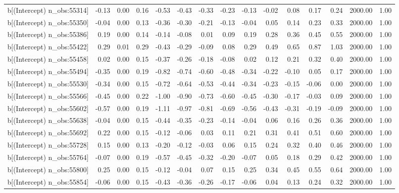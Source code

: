 \begin{table}[ht]
\begin{tabular}{rrrrrrrrrrrrrrr}
  b[(Intercept) n\_obs:55314] & -0.13 & 0.00 & 0.16 & -0.53 & -0.43 & -0.33 & -0.23 & -0.13 & -0.02 & 0.08 & 0.17 & 0.24 & 2000.00 & 1.00 \\ 
  b[(Intercept) n\_obs:55350] & -0.04 & 0.00 & 0.13 & -0.36 & -0.30 & -0.21 & -0.13 & -0.04 & 0.05 & 0.14 & 0.23 & 0.33 & 2000.00 & 1.00 \\ 
  b[(Intercept) n\_obs:55386] & 0.19 & 0.00 & 0.14 & -0.14 & -0.08 & 0.01 & 0.09 & 0.19 & 0.28 & 0.36 & 0.45 & 0.55 & 2000.00 & 1.00 \\ 
  b[(Intercept) n\_obs:55422] & 0.29 & 0.01 & 0.29 & -0.43 & -0.29 & -0.09 & 0.08 & 0.29 & 0.49 & 0.65 & 0.87 & 1.03 & 2000.00 & 1.00 \\ 
  b[(Intercept) n\_obs:55458] & 0.02 & 0.00 & 0.15 & -0.37 & -0.26 & -0.18 & -0.08 & 0.02 & 0.12 & 0.21 & 0.32 & 0.40 & 2000.00 & 1.00 \\ 
  b[(Intercept) n\_obs:55494] & -0.35 & 0.00 & 0.19 & -0.82 & -0.74 & -0.60 & -0.48 & -0.34 & -0.22 & -0.10 & 0.05 & 0.17 & 2000.00 & 1.00 \\ 
  b[(Intercept) n\_obs:55530] & -0.34 & 0.00 & 0.15 & -0.72 & -0.64 & -0.53 & -0.44 & -0.34 & -0.23 & -0.15 & -0.06 & 0.00 & 2000.00 & 1.00 \\ 
  b[(Intercept) n\_obs:55566] & -0.45 & 0.00 & 0.22 & -1.00 & -0.90 & -0.73 & -0.60 & -0.45 & -0.30 & -0.17 & -0.03 & 0.09 & 2000.00 & 1.00 \\ 
  b[(Intercept) n\_obs:55602] & -0.57 & 0.00 & 0.19 & -1.11 & -0.97 & -0.81 & -0.69 & -0.56 & -0.43 & -0.31 & -0.19 & -0.09 & 2000.00 & 1.00 \\ 
  b[(Intercept) n\_obs:55638] & -0.04 & 0.00 & 0.15 & -0.44 & -0.35 & -0.23 & -0.14 & -0.04 & 0.06 & 0.16 & 0.26 & 0.36 & 2000.00 & 1.00 \\ 
  b[(Intercept) n\_obs:55692] & 0.22 & 0.00 & 0.15 & -0.12 & -0.06 & 0.03 & 0.11 & 0.21 & 0.31 & 0.41 & 0.51 & 0.60 & 2000.00 & 1.00 \\ 
  b[(Intercept) n\_obs:55728] & 0.15 & 0.00 & 0.13 & -0.20 & -0.12 & -0.03 & 0.06 & 0.15 & 0.24 & 0.32 & 0.40 & 0.46 & 2000.00 & 1.00 \\ 
  b[(Intercept) n\_obs:55764] & -0.07 & 0.00 & 0.19 & -0.57 & -0.45 & -0.32 & -0.20 & -0.07 & 0.05 & 0.18 & 0.29 & 0.42 & 2000.00 & 1.00 \\ 
  b[(Intercept) n\_obs:55800] & 0.25 & 0.00 & 0.15 & -0.12 & -0.04 & 0.07 & 0.15 & 0.25 & 0.34 & 0.45 & 0.55 & 0.64 & 2000.00 & 1.00 \\ 
  b[(Intercept) n\_obs:55854] & -0.06 & 0.00 & 0.15 & -0.43 & -0.36 & -0.26 & -0.17 & -0.06 & 0.04 & 0.13 & 0.24 & 0.32 & 2000.00 & 1.00 \\ 

\end{tabular}
\end{table}
